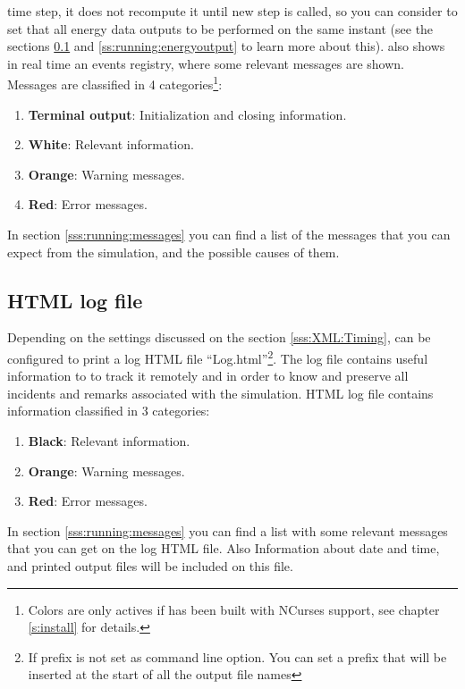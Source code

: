 time step, it does not recompute it until new step is called, so you can
consider to set that all energy data outputs to be performed on the same
instant (see the sections \ref{sss:running:logfile} and
\ref{ss:running:energyoutput} to learn more about this).\rc
%
\NAME also shows in real time an events registry, where some relevant
messages are shown. Messages are classified in 4
categories\footnote{Colors are only actives if \NAME has been built with
NCurses support, see chapter \ref{s:install} for details.}:
%
\begin{enumerate}
	\item \textbf{Terminal output}: Initialization and closing information.
	\item \textbf{White}: Relevant information.
	\item \textbf{Orange}: Warning messages.
	\item \textbf{Red}: Error messages.
\end{enumerate}
%
In section \ref{sss:running:messages} you can find a list of the messages
that you can expect from the simulation, and the possible causes of them.
%
\subsection{HTML log file}
\label{sss:running:logfile}
%
Depending on the settings discussed on the section \ref{sss:XML:Timing},
\NAME can be configured to print a log HTML file ``Log.html''\footnote{If
prefix is not set as command line option. You can set a prefix that will
be inserted at the start of all the output file names}. The log file contains
useful information to to track it remotely and in order to know and
preserve all incidents and remarks associated with the simulation.\rc
%
HTML log file contains information classified in 3 categories:
%
\begin{enumerate}
	\item \textbf{Black}: Relevant information.
	\item \textbf{Orange}: Warning messages.
	\item \textbf{Red}: Error messages.
\end{enumerate}
%
In section \ref{sss:running:messages} you can find a list with some relevant
messages that you can get on the log HTML file. Also Information about date
and time, and printed output files will be included on this file.
%
